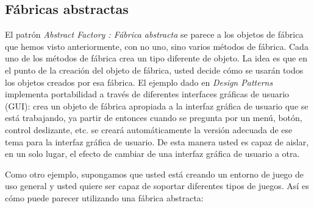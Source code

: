 \subsection*{Fábricas abstractas}
\label{subsec:fa}


El patrón \textit{Abstract Factory : Fábrica abstracta} se parece a los objetos de fábrica que hemos visto anteriormente, con no uno, sino varios métodos de fábrica. Cada uno de los métodos de fábrica crea un tipo diferente de objeto. La idea es que en el punto de la creación del objeto de fábrica, usted decide cómo se usarán todos los objetos creados por esa fábrica. El ejemplo dado en \textit{Design Patterns} implementa portabilidad a través de diferentes interfaces gráficas de usuario (GUI): crea un objeto de fábrica apropiada a la interfaz gráfica de usuario que se está trabajando, ya partir de entonces cuando se pregunta por un menú, botón, control deslizante, etc. se creará automáticamente la versión adecuada de ese tema para la interfaz gráfica de usuario. De esta manera usted es capaz de aislar, en un solo lugar, el efecto de cambiar de una interfaz gráfica de usuario a otra.     \newline

Como otro ejemplo, supongamos que usted está creando un entorno de juego de uso general y usted quiere ser capaz de soportar diferentes tipos de juegos. Así es cómo puede parecer utilizando una fábrica abstracta:     \newline

